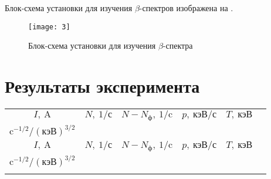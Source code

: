 \documentclass[a4paper, 12pt]{article}
\begin{document}
Блок-схема установки для изучения $\beta$-спектров изображена на
.


\begin{figure}[H]
    \texttt{[image: 3]} 
    \caption{Блок-схема установки для изучения $\beta$-спектра}
    \label{fig:3}
\end{figure}

\section{Результаты эксперимента}

\renewcommand{\arraystretch}{1.3}
\begin{longtable}{|c|c|c|c|c|c|}
\hline 
$I,\: \text{A}$ & $N,\: \text{1/с}$ & $N - N_\text{ф},\: \text{1/c}$ &
$p,\: \text{кэВ/с}$ & $T,\: \text{кэВ}$ & \begin{tabular}{c}  
    $\sqrt{N(p)}/p ^{3/2} \cdot 10 ^{-6}$, \\ 
    $\text{c}^{-1/2}/ (\text{кэВ})^{3/2}$ 
\end{tabular} \\ \hline 
	\endfirsthead
        \hline 
$I,\: \text{A}$ & $N,\: \text{1/с}$ & $N - N_\text{ф},\: \text{1/c}$ &
$p,\: \text{кэВ/с}$ & $T,\: \text{кэВ}$ & \begin{tabular}{c}  
    $\sqrt{N(p)}/p ^{3/2} \cdot 10 ^{-6}$, \\ 
    $\text{c}^{-1/2}/ (\text{кэВ})^{3/2}$ 
\end{tabular} \\ \hline 
	\endhead
	\hline
	\endfoot


\end{longtable}
\end{document}
